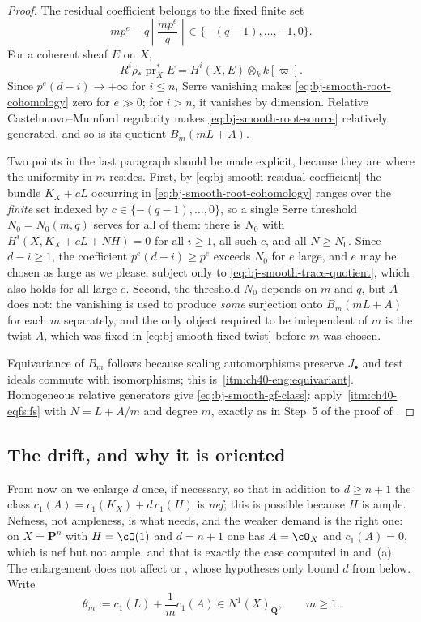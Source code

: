 \begin{proof}
The residual coefficient belongs to the fixed finite set
\[
 mp^e-q\left\lceil\frac{mp^e}{q}\right\rceil
     \in\{-(q-1),\ldots,-1,0\}.
\tag{40.18}\label{eq:bj-smooth-residual-coefficient}
\]
For a coherent sheaf $E$ on $X$,
\[
 R^i\rho_*\operatorname{pr}_X^*E
       =H^i(X,E)\otimes_k k[\varpi].
\tag{40.19}\label{eq:bj-smooth-product-cohomology}
\]
Since $p^e(d-i)\to+\infty$ for $i\le n$, Serre vanishing makes
\eqref{eq:bj-smooth-root-cohomology} zero for $e\gg0$; for $i>n$,
it vanishes by dimension.  Relative Castelnuovo--Mumford regularity makes
\eqref{eq:bj-smooth-root-source} relatively generated, and so is its
quotient $B_m(mL+A)$.

Two points in the last paragraph should be made explicit, because they are
where the uniformity in $m$ resides.  First, by
\eqref{eq:bj-smooth-residual-coefficient} the bundle
$K_X+cL$ occurring in \eqref{eq:bj-smooth-root-cohomology} ranges over the
\emph{finite} set indexed by $c\in\{-(q-1),\ldots,0\}$, so a single Serre
threshold $N_0=N_0(m,q)$ serves for all of them: there is $N_0$ with
$H^i(X,K_X+cL+NH)=0$ for all $i\ge1$, all such $c$, and all
$N\ge N_0$.  Since $d-i\ge1$, the coefficient $p^e(d-i)\ge p^e$
exceeds $N_0$ for $e$ large, and $e$ may be chosen as large as we
please, subject only to \eqref{eq:bj-smooth-trace-quotient}, which also
holds for all large $e$.  Second, the threshold $N_0$ depends on $m$
and $q$, but $A$ does not: the vanishing is used to produce
\emph{some} surjection onto $B_m(mL+A)$ for each $m$ separately, and the
only object required to be independent of $m$ is the twist $A$, which
was fixed in \eqref{eq:bj-smooth-fixed-twist} before $m$ was chosen.

Equivariance of $B_m$ follows because scaling automorphisms preserve
$J_\bullet$ and test ideals commute with isomorphisms; this is
\,\cref{itm:ch40-eng:equivariant}.
Homogeneous relative generators give \eqref{eq:bj-smooth-gf-class}: apply
\,\cref{itm:ch40-eqfs:fs} with
$N=L+A/m$ and degree $m$, exactly as in Step~5 of the proof of
.
\end{proof}

\subsection{The drift, and why it is oriented}
\label{sec:ch40-drift}

From now on we enlarge $d$ once, if necessary, so that in addition to
$d\ge n+1$ the class $c_1(A)=c_1(K_X)+d\,c_1(H)$ is \emph{nef}; this
is possible because $H$ is ample.  Nefness, not ampleness, is what
 needs, and the weaker demand is the
right one: on $X=\mathbf P^n$ with $H=\cO(1)$ and $d=n+1$ one has
$A=\cO_X$ and $c_1(A)=0$, which is nef but not ample, and that is
exactly the case computed in  and
\,(a).  The enlargement does not affect
 or
, whose hypotheses only bound $d$
from below.  Write
\[
 \theta_m:=c_1(L)+\frac1m c_1(A)\in N^1(X)_{\mathbf Q},
 \qquad m\ge1 .
\]

